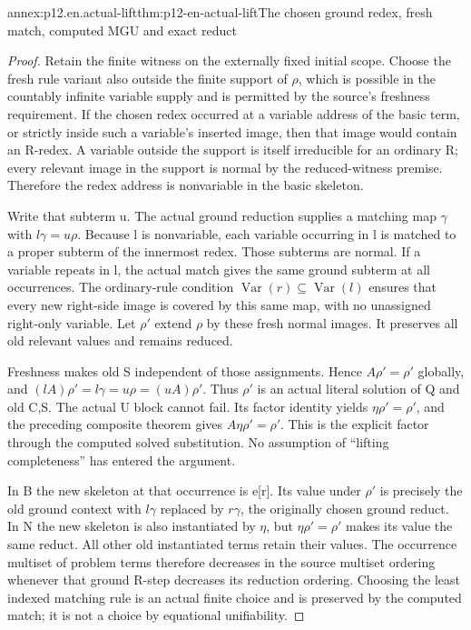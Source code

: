 \begin{annexitem}{annex:p12.en.actual-lift}{thm:p12-en-actual-lift}{The chosen ground redex, fresh match, computed MGU and exact reduct}
\begin{proof}
Retain the finite witness on the externally fixed initial scope.
Choose the fresh rule variant also outside the finite support of
\(\rho\), which is possible in the countably infinite variable
supply and is permitted by the source's freshness requirement.
If the chosen redex occurred at a variable address of the basic
term, or strictly inside such a variable's inserted image, then
that image would contain an R-redex. A variable outside the
support is itself irreducible for an ordinary R; every relevant
image in the support is normal by the reduced-witness premise.
Therefore the redex address is nonvariable in the basic skeleton.

Write that subterm u. The actual ground reduction supplies a
matching map \(\gamma\) with \(l\gamma=u\rho\). Because l
is nonvariable, each variable occurring in l is matched to a
proper subterm of the innermost redex. Those subterms are normal.
If a variable repeats in l, the actual match gives the same
ground subterm at all occurrences. The ordinary-rule condition
\(\operatorname{Var}(r)\subseteq\operatorname{Var}(l)\)
ensures that every new right-side image is covered by this same
map, with no unassigned right-only variable. Let \(\rho'\)
extend \(\rho\) by these fresh normal images. It preserves all
old relevant values and remains reduced.

Freshness makes old S independent of those assignments. Hence
\(A\rho'=\rho'\) globally, and
\((l A)\rho'=l\gamma=u\rho=(u A)\rho'\).
Thus \(\rho'\) is an actual literal solution of Q and old C,S.
The actual U block cannot fail. Its factor identity yields
\(\eta\rho'=\rho'\), and the preceding composite theorem
gives \(A\eta\rho'=\rho'\). This is the explicit factor
through the computed solved substitution. No assumption of
``lifting completeness'' has entered the argument.

In B the new skeleton at that occurrence is e[r]. Its value
under \(\rho'\) is precisely the old ground context with
\(l\gamma\) replaced by \(r\gamma\), the originally chosen
ground reduct. In N the new skeleton is also instantiated by
\(\eta\), but \(\eta\rho'=\rho'\) makes its value the
same reduct. All other old instantiated terms retain their values.
The occurrence multiset of problem terms therefore decreases in
the source multiset ordering whenever that ground R-step decreases
its reduction ordering. Choosing the least indexed matching rule
is an actual finite choice and is preserved by the computed match;
it is not a choice by equational unifiability.


\end{proof}
\end{annexitem}
